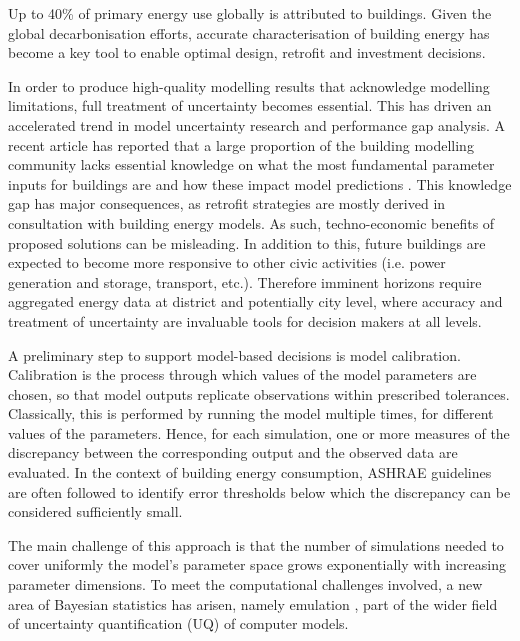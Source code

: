 \documentclass[preprint,12pt, sort&compress]{elsarticle}
\begin{document}
Up to 40\% of primary energy use globally is attributed to buildings. Given the global decarbonisation efforts, accurate characterisation of building energy has become a key tool to enable optimal design, retrofit and investment decisions.  

In order to produce high-quality modelling results that acknowledge modelling limitations, full treatment of uncertainty becomes essential. This has driven an accelerated trend in model uncertainty research and performance gap analysis. A recent article has reported that a large proportion of the building modelling community lacks essential knowledge on what the most fundamental parameter inputs for buildings are and how these impact model predictions \cite{imam2017}. This knowledge gap has major consequences, as retrofit strategies are mostly derived in consultation with building energy models. As such, techno-economic benefits of proposed solutions can be misleading. In addition to this, future buildings are expected to become more responsive to other civic activities (i.e. power generation and storage, transport, etc.)\cite{royapoor2018}. Therefore imminent horizons require aggregated energy data at district and potentially city level, where accuracy and treatment of uncertainty are invaluable tools for decision makers at all levels.

A preliminary step to support model-based decisions is model calibration. Calibration is the process through which values of the model parameters are chosen, so that model outputs replicate observations within prescribed tolerances. Classically, this is performed by running the model multiple times, for different values of the parameters. Hence, for each simulation, one or more measures of the discrepancy between the corresponding output and the observed data are evaluated. In the context of building energy consumption, ASHRAE guidelines \cite{ashrae2002} are often followed \cite{royapoor2015, hou2021} to identify error thresholds below which the discrepancy can be considered sufficiently small. 

The main challenge of this approach is that the number of simulations needed to cover uniformly the model’s parameter space grows exponentially with increasing parameter dimensions. To meet the computational challenges involved, a new area of Bayesian statistics has arisen, namely emulation \cite{goldstein2017, kennedy2001, ohagan2006tutorial, craig2001}, part of the wider field of uncertainty quantification (UQ) of computer models. 
\end{document}
